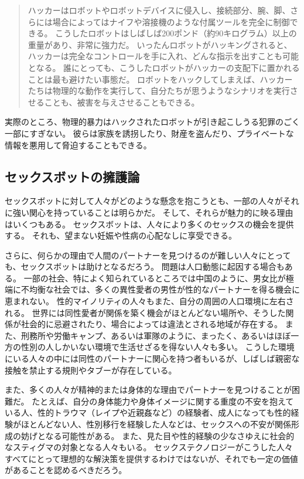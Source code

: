 \documentclass[paper=a4,book,openany]{jlreq} \usepackage{mystyle}
\begin{document}
\begin{quote}
ハッカーはロボットやロボットデバイスに侵入し、接続部分、腕、脚、さらには場合によってはナイフや溶接機のような付属ツールを完全に制御できる。
こうしたロボットはしばしば200ポンド（約90キログラム）以上の重量があり、非常に強力だ。
いったんロボットがハッキングされると、ハッカーは完全なコントロールを手に入れ、どんな指示を出すことも可能となる。
誰にとっても、こうしたロボットがハッカーの支配下に置かれることは最も避けたい事態だ。
ロボットをハックしてしまえば、ハッカーたちは物理的な動作を実行して、自分たちが思うようなシナリオを実行させることも、被害を与えさせることもできる。
\citep{oberhaus17:_secur_resear_hacked_bluet_enabl_butt_plug}
\end{quote}

実際のところ、物理的暴力はハックされたロボットが引き起こしうる犯罪のごく一部にすぎない。
彼らは家族を誘拐したり、財産を盗んだり、プライベートな情報を悪用して脅迫することもできる。

\subsection{セックスボットの擁護論}

セックスボットに対して人々がどのような懸念を抱こうとも、一部の人々がそれに強い関心を持っていることは明らかだ。
そして、それらが魅力的に映る理由はいくつもある。
セックスボットは、人々により多くのセックスの機会を提供する。
それも、望まない妊娠や性病の心配なしに享受できる。

さらに、何らかの理由で人間のパートナーを見つけるのが難しい人々にとっても、セックスボットは助けとなるだろう。
問題は人口動態に起因する場合もある。
一部の社会、特によく知られているところでは中国のように、男女比が極端に不均衡な社会では、多くの異性愛者の男性が性的なパートナーを得る機会に恵まれない。
性的マイノリティの人々もまた、自分の周囲の人口環境に左右される。
世界には同性愛者が関係を築く機会がほとんどない場所や、そうした関係が社会的に忌避されたり、場合によっては違法とされる地域が存在する。
また、刑務所や労働キャンプ、あるいは軍隊のように、まったく、あるいはほぼ一方の性別の人しかいない環境で生活せざるを得ない人々も多い。
こうした環境にいる人々の中には同性のパートナーに関心を持つ者もいるが、しばしば親密な接触を禁止する規則やタブーが存在している。

また、多くの人々が精神的または身体的な理由でパートナーを見つけることが困難だ。
たとえば、自分の身体能力や身体イメージに関する重度の不安を抱えている人、性的トラウマ（レイプや近親姦など）の経験者、成人になっても性的経験がほとんどない人、性別移行を経験した人などは、セックスへの不安が関係形成の妨げとなる可能性がある。
また、見た目や性的経験の少なさゆえに社会的なスティグマの対象となる人々もいる。
セックステクノロジーがこうした人々すべてにとって理想的な解決策を提供するわけではないが、それでも一定の価値があることを認めるべきだろう。
\end{document}
